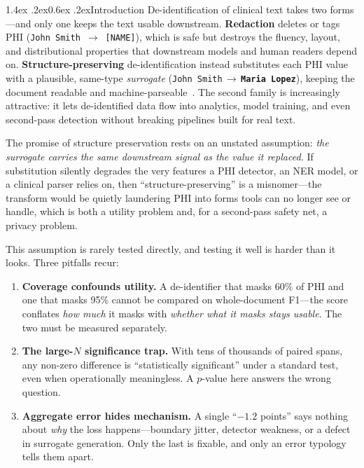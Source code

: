 \documentclass[11pt]{article}
\makeatletter
\newcommand{\oldv}[1]{\textcolor{cclay}{#1}}
\newcommand{\newv}[1]{\textcolor{caccent}{\textbf{#1}}}
\newcommand{\arr}{\,$\rightarrow$\,\allowbreak}
\renewcommand\section{\@startsection{section}{1}{\z@}%
  {1.4ex \@plus.2ex}{0.6ex \@plus.2ex}{\normalfont\large\bfseries}}
\newcommand{\tp}[1]{\texttt{#1}}
\makeatother
\begin{document}
\section{Introduction}
De-identification of clinical text takes two forms---and only one keeps the text usable downstream. \textbf{Redaction} deletes or tags PHI (\oldv{\tp{John Smith}}~$\rightarrow$~\tp{[NAME]}), which is safe but destroys the fluency, layout, and distributional properties that downstream models and human readers depend on. \textbf{Structure-preserving} de-identification instead substitutes each PHI value with a plausible, same-type \emph{surrogate} (\oldv{\tp{John Smith}}\arr\newv{\tp{Maria Lopez}}), keeping the document readable and machine-parseable~\citep{carrell2013hiding}. The second family is increasingly attractive: it lets de-identified data flow into analytics, model training, and even second-pass detection without breaking pipelines built for real text.

The promise of structure preservation rests on an unstated assumption: \emph{the surrogate carries the same downstream signal as the value it replaced.} If substitution silently degrades the very features a PHI detector, an NER model, or a clinical parser relies on, then ``structure-preserving'' is a misnomer---the transform would be quietly laundering PHI into forms tools can no longer see or handle, which is both a utility problem and, for a second-pass safety net, a privacy problem.

This assumption is rarely tested directly, and testing it well is harder than it looks. Three pitfalls recur:
\begin{enumerate}\itemsep2pt
\item \textbf{Coverage confounds utility.} A de-identifier that masks 60\% of PHI and one that masks 95\% cannot be compared on whole-document F1---the score conflates \emph{how much} it masks with \emph{whether what it masks stays usable}. The two must be measured separately.
\item \textbf{The large-$N$ significance trap.} With tens of thousands of paired spans, any non-zero difference is ``statistically significant'' under a standard test, even when operationally meaningless. A $p$-value here answers the wrong question.
\item \textbf{Aggregate error hides mechanism.} A single ``$-1.2$ points'' says nothing about \emph{why} the loss happens---boundary jitter, detector weakness, or a defect in surrogate generation. Only the last is fixable, and only an error typology tells them apart.
\end{enumerate}
\end{document}
